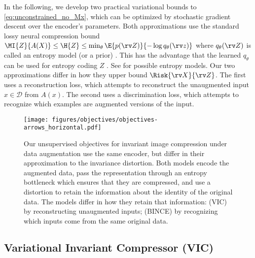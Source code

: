 \documentclass[final]{article}
\begin{document}
In the following, we develop two practical variational bounds to \cref{eq:unconstrained_no_Mx}, which can be optimized by stochastic gradient descent \cite{bottou_large-scale_2010} over the encoder's parameters. Both approximations use the standard lossy neural compression bound
$ \MI{Z}{A(X)}  \leq \H{Z} \leq \min_{\theta}  \E{p(\rv Z)} {-\log q_\theta(\rv z)} $ where $q_\theta(\rv Z)$ is called an entropy model (or a prior) \cite{balle_end--end_2017,theis_lossy_2017}. This has the advantage that the learned $q_\theta$ can be used for entropy coding $Z$ \cite{rissanen_generalized_1976,duda_asymmetric_2009}. See \citet{balle_variational_2018} for possible entropy models. Our two approximations differ in how they upper bound $\Risk{\rv X}{\rv Z}$.
The first uses a reconstruction loss, which attempts to reconstruct the unaugmented input $x \in \mathcal{D}$ from $A(x)$.
The second uses a discrimination loss, which attempts to recognize which examples are augmented versions of the input.












\begin{figure}
\centering
\texttt{[image: figures/objectives/objectives-arrows\_horizontal.pdf]}
\vspace*{-1.5em}
\caption{
Our unsupervised objectives for invariant image compression under data augmentation use the same encoder, but differ in their approximation to the invariance distortion.
Both models encode the augmented data, pass the representation through an entropy bottleneck which ensures that they are compressed, and use a distortion to retain the information about the identity of the original data.
The models differ in how they retain that information: 
(VIC) by reconstructing unaugmented inputs;
(BINCE) by recognizing which inputs come from the same original data. 
}\label{fig:objectives}
\vspace{-1\baselineskip}
\end{figure} 
\subsection{Variational Invariant Compressor (VIC)}
\end{document}
